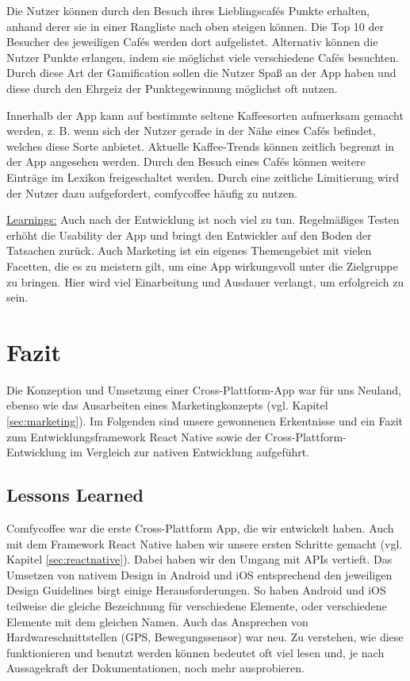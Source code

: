 Die Nutzer können durch den Besuch ihres Lieblingscafés Punkte erhalten, anhand derer sie in einer Rangliste nach oben steigen können. Die Top 10 der Besucher des jeweiligen Cafés werden dort aufgelistet. Alternativ können die Nutzer Punkte erlangen, indem sie möglichst viele verschiedene Cafés besuchten. Durch diese Art der Gamification sollen die Nutzer Spaß an der App haben und diese durch den Ehrgeiz der Punktegewinnung möglichst oft nutzen.

Innerhalb der App kann auf bestimmte seltene Kaffeesorten aufmerksam gemacht werden, z. B. wenn sich der Nutzer gerade in der Nähe eines Cafés befindet, welches diese Sorte anbietet. Aktuelle Kaffee-Trends können zeitlich begrenzt in der App angesehen werden. Durch den Besuch eines Cafés können weitere Einträge im Lexikon freigeschaltet werden. Durch eine zeitliche Limitierung wird der Nutzer dazu aufgefordert, comfycoffee häufig zu nutzen.

\underline{Learnings:}
Auch nach der Entwicklung ist noch viel zu tun. Regelmäßiges Testen erhöht die Usability der App und bringt den Entwickler auf den Boden der Tatsachen zurück. Auch Marketing ist ein eigenes Themengebiet mit vielen Facetten, die es zu meistern gilt, um eine App wirkungsvoll unter die Zielgruppe zu bringen. Hier wird viel Einarbeitung und Ausdauer verlangt, um erfolgreich zu sein.

\chapter{Fazit}
\label{fazit}
Die Konzeption und Umsetzung einer Cross-Plattform-App war für uns Neuland, ebenso wie das Ausarbeiten eines Marketingkonzepts (vgl. Kapitel \ref{sec:marketing}). Im Folgenden sind unsere gewonnenen Erkentnisse und ein Fazit zum Entwicklungsframework React Native sowie der Cross-Plattform-Entwicklung im Vergleich zur nativen Entwicklung aufgeführt.

\section{Lessons Learned}
Comfycoffee war die erste Cross-Plattform App, die wir entwickelt haben. Auch mit dem Framework React Native haben wir unsere ersten Schritte gemacht (vgl. Kapitel \ref{sec:reactnative}). Dabei haben wir den Umgang mit APIs vertieft. Das Umsetzen von nativem Design in Android und iOS entsprechend den jeweiligen Design Guidelines birgt einige Herausforderungen. So haben Android und iOS teilweise die gleiche Bezeichnung für verschiedene Elemente, oder verschiedene Elemente mit dem gleichen Namen. Auch das Ansprechen von Hardwareschnittstellen (GPS, Bewegungssensor) war neu. Zu verstehen, wie diese funktionieren und benutzt werden können bedeutet oft viel lesen und, je nach Aussagekraft der Dokumentationen, noch mehr ausprobieren.

